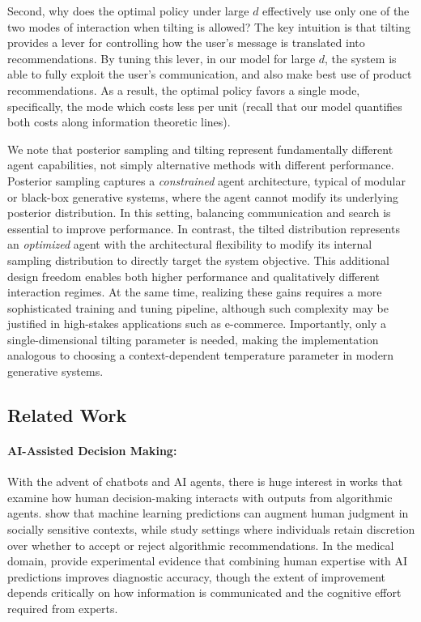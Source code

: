 \documentclass[12pt]{article}
\theoremstyle{definition}
\theoremstyle{remark}
\begin{document}
Second, why does the optimal policy under large $d$ effectively use only one of the two modes of interaction when tilting is allowed? The key intuition is that tilting provides a lever for controlling how the user’s message is translated into recommendations. By tuning this lever, in our model for large $d$, the system is able to fully exploit the user's communication, and also make best use of product recommendations. As a result, the optimal policy favors a single mode, specifically, the mode which costs less per unit (recall that our model quantifies both costs along information theoretic lines).

We note that posterior sampling and tilting represent fundamentally different agent capabilities, not simply alternative methods with different performance. Posterior sampling captures a \textit{constrained} agent architecture, typical of modular or black-box generative systems, where the agent cannot modify its underlying posterior distribution. In this setting, balancing communication and search is essential to improve performance. In contrast, the tilted distribution represents an \textit{optimized} agent with the architectural flexibility to modify its internal sampling distribution to directly target the system objective. This additional design freedom enables both higher performance and qualitatively different interaction regimes. At the same time, realizing these gains requires a more sophisticated training and tuning pipeline, although such complexity may be justified in high-stakes applications such as e-commerce. Importantly, only a single-dimensional tilting parameter is needed, making the implementation analogous to choosing a context-dependent temperature parameter in modern generative systems.

\subsection{Related Work}
\paragraph{AI-Assisted Decision Making:} With the advent of chatbots and AI agents, there is huge interest in works that examine how human decision-making interacts with outputs from algorithmic agents. \citet{kleinberg2018human} show that machine learning predictions can augment human judgment in socially sensitive contexts, while \citet{angelova2023algorithmic} study settings where individuals retain discretion over whether to accept or reject algorithmic recommendations. In the medical domain, \citet{agarwal2023combining} provide experimental evidence that combining human expertise with AI predictions improves diagnostic accuracy, though the extent of improvement depends critically on how information is communicated and the cognitive effort required from experts.
\end{document}
